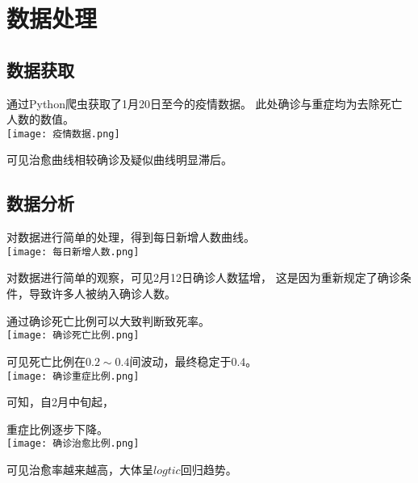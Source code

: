 \section{数据处理}
\subsection{数据获取}
通过Python爬虫获取了1月20日至今的疫情数据。
此处确诊与重症均为去除死亡人数的数值。
\\
\texttt{[image: 疫情数据.png]}
\par
可见治愈曲线相较确诊及疑似曲线明显滞后。
\subsection{数据分析}
对数据进行简单的处理，得到每日新增人数曲线。
\\
\texttt{[image: 每日新增人数.png]}
\par
对数据进行简单的观察，可见2月12日确诊人数猛增，
这是因为重新规定了确诊条件，导致许多人被纳入确诊人数。
\par
通过确诊死亡比例可以大致判断致死率。
\\
\texttt{[image: 确诊死亡比例.png]}
\par
可见死亡比例在$0.2\sim 0.4$间波动，最终稳定于$0.4$。
\\
\texttt{[image: 确诊重症比例.png]}
\par
可知，自2月中旬起，
\begin{}

\end{}重症比例逐步下降。
\\
\texttt{[image: 确诊治愈比例.png]}
\par
可见治愈率越来越高，大体呈$logtic$回归趋势。

